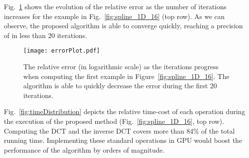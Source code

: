 \documentclass[preprint]{imsart}
\begin{document}
\begin{figure*}
    \centerline{
        \hfill
        \hfill
        \hfill
        \hfill
    }
    \caption{Noisy data (in green) further contaminated with uniform noise (in red). The spline , depicted in blue, is obtained using different fitting terms. The proposed method with the L1 fitting term recovers the correct shape.}
    \label{fig:spline_1D_16}
\end{figure*}

Fig.~\ref{fig:errorPlot} shows the evolution of the relative error as the number of iterations increases for the example in Fig.~\ref{fig:spline_1D_16} (top row).
As we can observe, the proposed algorithm is able to converge quickly, reaching a precision of  in less than 20 iterations.

\begin{figure}
    \centering
    \texttt{[image: errorPlot.pdf]}

    \caption{The relative error (in logarithmic scale) as the iterations progress when computing the first example in Figure~\protect\ref{fig:spline_1D_16}. The algorithm is able to quickly decrease the error during the first 20 iterations.}
    \label{fig:errorPlot}
\end{figure}

Fig.~\ref{fig:timeDistribution} depicts the relative time-cost of each operation during the execution of the proposed method (Fig.~\ref{fig:spline_1D_16}, top row). Computing the DCT and the inverse DCT covers more than 84\% of the total running time.
Implementing these standard operations in GPU would boost the performance of the algorithm by orders of magnitude.
\end{document}
